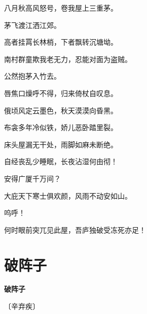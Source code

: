 \documentclass[12pt,UTF-8,openany,fontset=none]{ctexbook}
\begin{document}
\begin{center}
    \begin{Large}

        八月秋高风怒号，卷我屋上三重茅。

        茅飞渡江洒江郊。

        高者挂罥长林梢，下者飘转沉塘坳。

        南村群童欺我老无力，忍能对面为盗贼。\hspace{24pt}

        公然抱茅入竹去。

        唇焦口燥呼不得，归来倚杖自叹息。

        俄顷风定云墨色，秋天漠漠向昏黑。

        布衾多年冷似铁，娇儿恶卧踏里裂。

        床头屋漏无干处，雨脚如麻未断绝。

        自经丧乱少睡眠，长夜沾湿何由彻！

        安得广厦千万间？
        
        大庇天下寒士俱欢颜，风雨不动安如山。\hspace{24pt}

        呜呼！
        
        何时眼前突兀见此屋，吾庐独破受冻死亦足！

    \end{Large}

\end{center}

\vspace{8pt}
\clearpage

\section{破阵子}


\begin{center}
    {\bfseries 破阵子}

    \vspace{18pt}

    \begin{large}\xuwen
        〔辛弃疾〕
    \end{large}

\end{center}

    \vspace{18pt}  %
\end{document}
